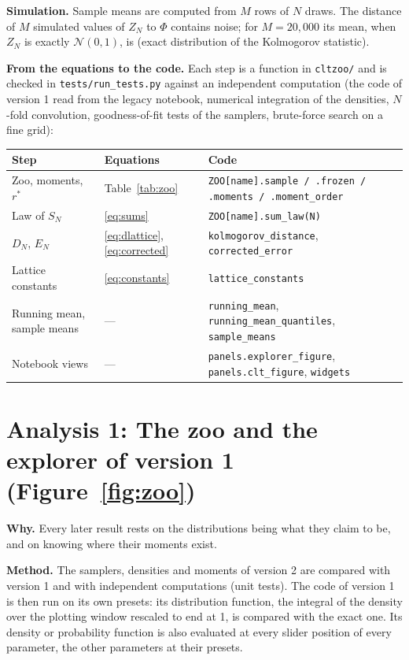 \documentclass[11pt,a4paper]{article}
\begin{document}
\textbf{Simulation.} Sample means are computed from $M$ rows of $N$ draws. The distance of $M$ simulated values of $Z_N$ to
$\Phi$ contains noise; for $M = 20{,}000$ its mean, when $Z_N$ is exactly $\mathcal N(0,1)$, is \Noise{} (exact distribution of the
Kolmogorov statistic).

\textbf{From the equations to the code.} Each step is a function in \texttt{cltzoo/} and is checked in \texttt{tests/run\_tests.py}
against an independent computation (the code of version 1 read from the legacy notebook, numerical integration of the densities,
$N$-fold convolution, goodness-of-fit tests of the samplers, brute-force search on a fine grid):

\begin{center}\footnotesize
\begin{tabularx}{\textwidth}{@{}>{\raggedright\arraybackslash}p{2.3cm}>{\raggedright\arraybackslash}p{2.0cm}>{\raggedright\arraybackslash}X@{}}
\toprule
Step & Equations & Code \\
\midrule
Zoo, moments, $r^\ast$ & Table~\ref{tab:zoo} & \texttt{ZOO[name].sample / .frozen / .moments / .moment\_order} \\
Law of $S_N$ & \eqref{eq:sums} & \texttt{ZOO[name].sum\_law(N)} \\
$D_N$, $E_N$ & \eqref{eq:dlattice}, \eqref{eq:corrected} & \texttt{kolmogorov\_distance}, \texttt{corrected\_error} \\
Lattice constants & \eqref{eq:constants} & \texttt{lattice\_constants} \\
Running mean, sample means & --- & \texttt{running\_mean}, \texttt{running\_mean\_quantiles}, \texttt{sample\_means} \\
Notebook views & --- & \texttt{panels.explorer\_figure}, \texttt{panels.clt\_figure}, \texttt{widgets} \\
\bottomrule
\end{tabularx}
\end{center}

\section{Analysis 1: The zoo and the explorer of version 1 (Figure~\ref{fig:zoo})}

\textbf{Why.} Every later result rests on the distributions being what they claim to be, and on knowing where their moments exist.

\textbf{Method.} The samplers, densities and moments of version 2 are compared with version 1 and with independent computations
(unit tests). The code of version 1 is then run on its own presets: its distribution function, the integral of the density over
the plotting window rescaled to end at 1, is compared with the exact one. Its density or probability function is also evaluated at
every slider position of every parameter, the other parameters at their presets.
\end{document}
